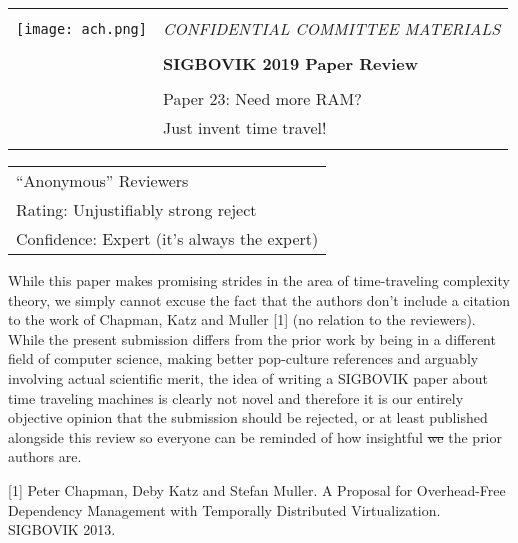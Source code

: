 \documentclass[12pt]{article}
\begin{document}
{\sffamily
\begin{tabular}{ll}
\multirow{3}{*}{\texttt{[image: ach.png]}}\\
& \Large{\em CONFIDENTIAL COMMITTEE MATERIALS} \\
&\\
& \textbf{\Huge{SIGBOVIK 2019 Paper Review}} \\
&\\
& \LARGE{Paper 23: Need more RAM?} \\[0.25em]
& \LARGE{Just invent time travel!} \\
&\\
\hline
\end{tabular}}
\vspace{2em}
\thispagestyle{empty}

{\large\bf
  \begin{tabular}{l}
    ``Anonymous'' Reviewers\\
Rating: Unjustifiably strong reject \\
Confidence: Expert (it's always the expert)\\
\end{tabular}}
\vspace{1em}

While this paper makes promising strides in the area of time-traveling
complexity theory, we simply cannot excuse the fact that the authors
don't include a citation to the work of Chapman, Katz and Muller [1] (no
relation to the reviewers). While the present submission differs from
the prior work by being in a different field of computer science, making
better pop-culture references and arguably involving actual scientific
merit, the idea of writing a SIGBOVIK paper about time traveling machines
is clearly
not novel and therefore it is our entirely objective opinion that the
submission should be rejected, or at least published alongside this
review so everyone can be reminded of how insightful \sout{we} the prior
authors are.

[1] Peter Chapman, Deby Katz and Stefan Muller. A Proposal for
Overhead-Free Dependency Management with Temporally Distributed
Virtualization. SIGBOVIK 2013.
\end{document}

